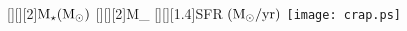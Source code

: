 \documentclass{article}
\begin{document}
 \thispagestyle{empty}
 \begin{figure}
 [][][2]{{${{\rm M}_{\star} ({\rm M}_{\odot}})$}} 
 [][][2]{{\rm M}_{\odot}}
 [][][1.4]{SFR $({\rm M}_{\odot}/{\rm{yr}})$}
 \texttt{[image: crap.ps]}
 \end{figure}
 
\end{document}
